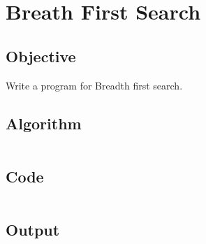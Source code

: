 \section{Breath First Search}
\label{sec:Breath First Search}

\subsection{Objective}
Write a program for Breadth first search.

\subsection{Algorithm}
\begin{lstlisting}[style=mystyle]
\end{lstlisting}

\subsection{Code}
\inputminted[]{c}{../../Code/bfs.c}

\subsection{Output}
\begin{lstlisting}[style=output]
\end{lstlisting}

\pagebreak
